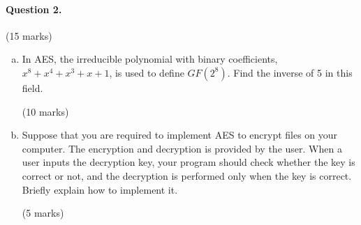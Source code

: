 \documentclass[12pt]{article}
\begin{document}
\paragraph{Question 2.}\hfill (15 marks)
\begin{enumerate}[(a)]
\item In AES, the irreducible polynomial with binary coefficients, $x^8+x^4+x^3+x+1$, is used to define $GF(2^8)$. Find the inverse of 5 in this field.{\vspace{-0.5em}\begin{flushright} (10 marks)\end{flushright}}
\item Suppose that you are required to implement AES to encrypt files on your computer. The encryption and decryption is provided by the user. When a user inputs the decryption key, your program should check whether the key is correct or not, and the decryption is performed only when the key is correct. Briefly explain how to implement it.
{\vspace{-0.5em}\begin{flushright} (5 marks)\end{flushright}}
\end{enumerate}

\newpage 
\end{document}
